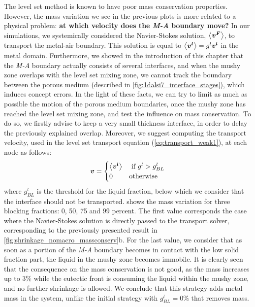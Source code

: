 The level set method is known to have poor mass conservation properties. However, the mass variation
we see in the previous plots is more related to a physical problem: \textbf{at which velocity does the \emph{M-A} boundary move?}
In our simulations, we systemically considered the Navier-Stokes solution, $\left \langle \boldsymbol{v^F} \right \rangle$,
to transport the metal-air boundary. This solution is equal to $\left \langle \boldsymbol{v^l} \right \rangle= {g^l} \boldsymbol{v^l}$ in the metal domain. 
Furthermore, we showed in the introduction of this chapter that the \emph{M-A} boundary actually consists of several interfaces, 
and when the mushy zone overlaps with the level set mixing zone, we cannot track the boundary between the porous medium 
(described in \cref{fig:1dalsi7_interface_stages}), which induces concept errors.
In the light of these facts, we can try to limit as much as possible the motion of the porous medium boundaries, once the mushy zone has reached the level set mixing zone,
and test the influence on mass conservation.
To do so, we firstly advise to keep a very small thickness interface, in order to delay the previously explained overlap. Moreover, we suggest computing the 
transport velocity, used in the level set transport equation (\cref{eq:transport_weak1}), at each node as follows:
\begin{align}
\label{eq:}
\boldsymbol{v} =
\begin{cases}
  \left \langle \boldsymbol{v^l} \right \rangle		& \text{ if } g^l > g_{BL}^l \\
  0 		& \text{otherwise}
\end{cases}
\end{align}
where $g_{BL}^l$ is the threshold for the liquid fraction, below which we consider that the interface should not be transported.
 shows the mass variation for three blocking fractions: 0, 50, 75 and 99 percent.
The first value corresponds the case where the Navier-Stokes solution is directly passed to the transport solver, corresponding to the previously presented result in \cref{fig:shrinkage_nomacro_massconserv}b.
For the last value, we consider that as soon as a portion of the \emph{M-A} boundary becomes
in contact with the low solid fraction part, the liquid in the mushy zone becomes immobile. 
It is clearly seen that the consequence on the mass conservation is not good, as 
the mass increases up to 3\% while the eutectic front is consuming the liquid within the mushy zone, and no further shrinkage is allowed.
We conclude that this strategy adds metal mass in the system, unlike the initial strategy with $g_{BL}^l=0\%$ that
removes mass.

